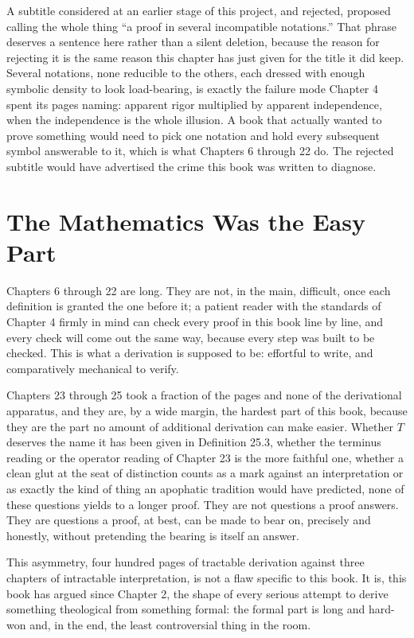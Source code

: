 \documentclass[11pt]{book}
\begin{document}
A subtitle considered at an earlier stage of this project, and rejected, proposed calling the whole thing ``a proof in several incompatible notations.'' That phrase deserves a sentence here rather than a silent deletion, because the reason for rejecting it is the same reason this chapter has just given for the title it did keep. Several notations, none reducible to the others, each dressed with enough symbolic density to look load-bearing, is exactly the failure mode Chapter 4 spent its pages naming: apparent rigor multiplied by apparent independence, when the independence is the whole illusion. A book that actually wanted to prove something would need to pick one notation and hold every subsequent symbol answerable to it, which is what Chapters 6 through 22 do. The rejected subtitle would have advertised the crime this book was written to diagnose.

\chapter{The Mathematics Was the Easy Part}

Chapters 6 through 22 are long. They are not, in the main, difficult, once each definition is granted the one before it; a patient reader with the standards of Chapter 4 firmly in mind can check every proof in this book line by line, and every check will come out the same way, because every step was built to be checked. This is what a derivation is supposed to be: effortful to write, and comparatively mechanical to verify.

Chapters 23 through 25 took a fraction of the pages and none of the derivational apparatus, and they are, by a wide margin, the hardest part of this book, because they are the part no amount of additional derivation can make easier. Whether $T$ deserves the name it has been given in Definition 25.3, whether the terminus reading or the operator reading of Chapter 23 is the more faithful one, whether a clean glut at the seat of distinction counts as a mark against an interpretation or as exactly the kind of thing an apophatic tradition would have predicted, none of these questions yields to a longer proof. They are not questions a proof answers. They are questions a proof, at best, can be made to bear on, precisely and honestly, without pretending the bearing is itself an answer.

This asymmetry, four hundred pages of tractable derivation against three chapters of intractable interpretation, is not a flaw specific to this book. It is, this book has argued since Chapter 2, the shape of every serious attempt to derive something theological from something formal: the formal part is long and hard-won and, in the end, the least controversial thing in the room.
\end{document}
